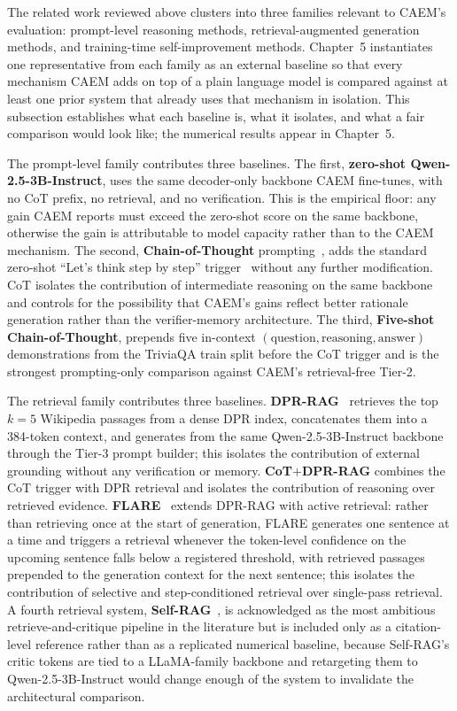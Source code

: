 The related work reviewed above clusters into three families relevant to CAEM's evaluation: prompt-level reasoning methods, retrieval-augmented generation methods, and training-time self-improvement methods. Chapter~5 instantiates one representative from each family as an external baseline so that every mechanism CAEM adds on top of a plain language model is compared against at least one prior system that already uses that mechanism in isolation. This subsection establishes what each baseline is, what it isolates, and what a fair comparison would look like; the numerical results appear in Chapter~5.

The prompt-level family contributes three baselines. The first, \textbf{zero-shot Qwen-2.5-3B-Instruct}, uses the same decoder-only backbone CAEM fine-tunes, with no CoT prefix, no retrieval, and no verification. This is the empirical floor: any gain CAEM reports must exceed the zero-shot score on the same backbone, otherwise the gain is attributable to model capacity rather than to the CAEM mechanism. The second, \textbf{Chain-of-Thought} prompting~\cite{wei2022chain}, adds the standard zero-shot ``Let's think step by step'' trigger~\cite{kojima2022large} without any further modification. CoT isolates the contribution of intermediate reasoning on the same backbone and controls for the possibility that CAEM's gains reflect better rationale generation rather than the verifier-memory architecture. The third, \textbf{Five-shot Chain-of-Thought}, prepends five in-context $(\text{question}, \text{reasoning}, \text{answer})$ demonstrations from the TriviaQA train split before the CoT trigger and is the strongest prompting-only comparison against CAEM's retrieval-free Tier-2.

The retrieval family contributes three baselines. \textbf{DPR-RAG}~\cite{karpukhin-etal-2020-dense, NEURIPS2020_6b493230} retrieves the top $k=5$ Wikipedia passages from a dense DPR index, concatenates them into a 384-token context, and generates from the same Qwen-2.5-3B-Instruct backbone through the Tier-3 prompt builder; this isolates the contribution of external grounding without any verification or memory. \textbf{CoT$+$DPR-RAG} combines the CoT trigger with DPR retrieval and isolates the contribution of reasoning over retrieved evidence. \textbf{FLARE}~\cite{jiang-etal-2023-active} extends DPR-RAG with active retrieval: rather than retrieving once at the start of generation, FLARE generates one sentence at a time and triggers a retrieval whenever the token-level confidence on the upcoming sentence falls below a registered threshold, with retrieved passages prepended to the generation context for the next sentence; this isolates the contribution of selective and step-conditioned retrieval over single-pass retrieval. A fourth retrieval system, \textbf{Self-RAG}~\cite{asai2024selfrag}, is acknowledged as the most ambitious retrieve-and-critique pipeline in the literature but is included only as a citation-level reference rather than as a replicated numerical baseline, because Self-RAG's critic tokens are tied to a LLaMA-family backbone and retargeting them to Qwen-2.5-3B-Instruct would change enough of the system to invalidate the architectural comparison.

